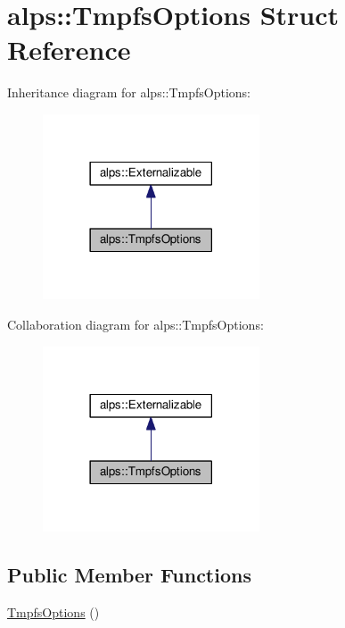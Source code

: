 \hypertarget{structalps_1_1TmpfsOptions}{}\section{alps\+:\+:Tmpfs\+Options Struct Reference}
\label{structalps_1_1TmpfsOptions}


Inheritance diagram for alps\+:\+:Tmpfs\+Options\+:
\nopagebreak
\begin{figure}[H]
\begin{center}
\leavevmode
\includegraphics[width=182pt]{structalps_1_1TmpfsOptions__inherit__graph}
\end{center}
\end{figure}


Collaboration diagram for alps\+:\+:Tmpfs\+Options\+:
\nopagebreak
\begin{figure}[H]
\begin{center}
\leavevmode
\includegraphics[width=182pt]{structalps_1_1TmpfsOptions__coll__graph}
\end{center}
\end{figure}
\subsection*{Public Member Functions}
\begin{DoxyCompactItemize}
\item 
\hyperlink{structalps_1_1TmpfsOptions_aa7d24ac1be4e5bcc6822f5ea1753cc3c}{Tmpfs\+Options} ()
\end{DoxyCompactItemize}
